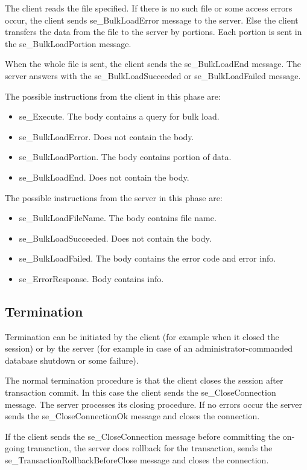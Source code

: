 \documentclass[a4paper,12pt]{article}
\begin{document}
The client reads the file specified. If there is no such file or some access errors occur, the client sends se\_BulkLoadError message to the server. Else the client transfers the data from the file to the server by portions. Each portion is sent in the se\_BulkLoadPortion message.

When the whole file is sent, the client sends the se\_BulkLoadEnd message. The server answers with the se\_BulkLoadSucceeded or se\_BulkLoadFailed message.

The possible instructions from the client in this phase are:
\begin{itemize}
\item se\_Execute. The body contains a query for bulk load.
\item se\_BulkLoadError. Does not contain the body.    
\item se\_BulkLoadPortion. The body contains portion of data.
\item se\_BulkLoadEnd. Does not contain the body.
\end{itemize}

The possible instructions from the server in this phase are:
\begin{itemize}
\item se\_BulkLoadFileName. The body contains file name.
\item se\_BulkLoadSucceeded. Does not contain the body.
\item se\_BulkLoadFailed. The body contains the error code and error info.
\item se\_ErrorResponse. Body contains info.
\end{itemize}

\subsection{Termination}
Termination can be initiated by the client (for example when it closed the session) or by the server (for example in case of an administrator-commanded database shutdown or some failure). 

The normal termination procedure is that the client closes the session after transaction commit. In this case the client sends the se\_CloseConnection message. The server processes its closing procedure. If no errors occur the server sends the se\_CloseConnectionOk message and closes the connection.

If the client sends the se\_CloseConnection message before committing the on-going transaction, the server does rollback for the transaction, sends the se\_TransactionRollbackBeforeClose message and closes the connection.
\end{document}
